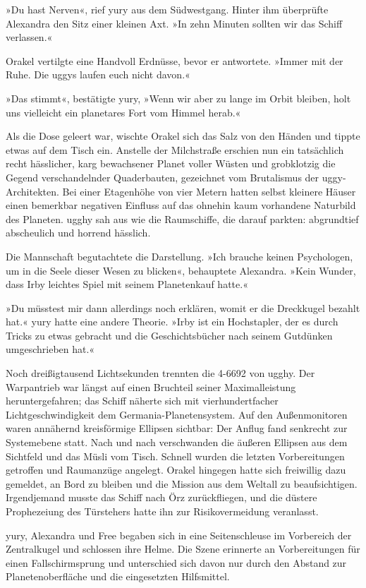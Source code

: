 »Du hast Nerven«, rief yury aus dem Südwestgang. Hinter ihm überprüfte Alexandra den Sitz einer kleinen Axt. »In zehn Minuten sollten wir das Schiff verlassen.«

Orakel vertilgte eine Handvoll Erdnüsse, bevor er antwortete. »Immer mit der Ruhe. Die uggys laufen euch nicht davon.«

»Das stimmt«, bestätigte yury, »Wenn wir aber zu lange im Orbit bleiben, holt uns vielleicht ein planetares Fort vom Himmel herab.«

Als die Dose geleert war, wischte Orakel sich das Salz von den Händen und tippte etwas auf dem Tisch ein. Anstelle der Milchstraße erschien nun ein tatsächlich recht hässlicher, karg bewachsener Planet voller Wüsten und grobklotzig die Gegend verschandelnder Quaderbauten, gezeichnet vom Brutalismus der uggy-Architekten. Bei einer Etagenhöhe von vier Metern hatten selbst kleinere Häuser einen bemerkbar negativen Einfluss auf das ohnehin kaum vorhandene Naturbild des Planeten. ugghy sah aus wie die Raumschiffe, die darauf parkten: abgrundtief abscheulich und horrend hässlich.

Die Mannschaft begutachtete die Darstellung. »Ich brauche keinen Psychologen, um in die Seele dieser Wesen zu blicken«, behauptete Alexandra. »Kein Wunder, dass Irby leichtes Spiel mit seinem Planetenkauf hatte.«

»Du müsstest mir dann allerdings noch erklären, womit er die Dreckkugel bezahlt hat.« yury hatte eine andere Theorie. »Irby ist ein Hochstapler, der es durch Tricks zu etwas gebracht und die Geschichtsbücher nach seinem Gutdünken umgeschrieben hat.«

Noch dreißigtausend Lichtsekunden trennten die 4-6692 von ugghy. Der Warpantrieb war längst auf einen Bruchteil seiner Maximalleistung heruntergefahren; das Schiff näherte sich mit vierhundertfacher Lichtgeschwindigkeit dem Germania-Planetensystem. Auf den Außenmonitoren waren annähernd kreisförmige Ellipsen sichtbar: Der Anflug fand senkrecht zur Systemebene statt. Nach und nach verschwanden die äußeren Ellipsen aus dem Sichtfeld und das Müsli vom Tisch. Schnell wurden die letzten Vorbereitungen getroffen und Raumanzüge angelegt. Orakel hingegen hatte sich freiwillig dazu gemeldet, an Bord zu bleiben und die Mission aus dem Weltall zu beaufsichtigen. Irgendjemand musste das Schiff nach Örz zurückfliegen, und die düstere Prophezeiung des Türstehers hatte ihn zur Risikovermeidung veranlasst.

yury, Alexandra und Free begaben sich in eine Seitenschleuse im Vorbereich der Zentralkugel und schlossen ihre Helme. Die Szene erinnerte an Vorbereitungen für einen Fallschirmsprung und unterschied sich davon nur durch den Abstand zur Planetenoberfläche und die eingesetzten Hilfsmittel.

